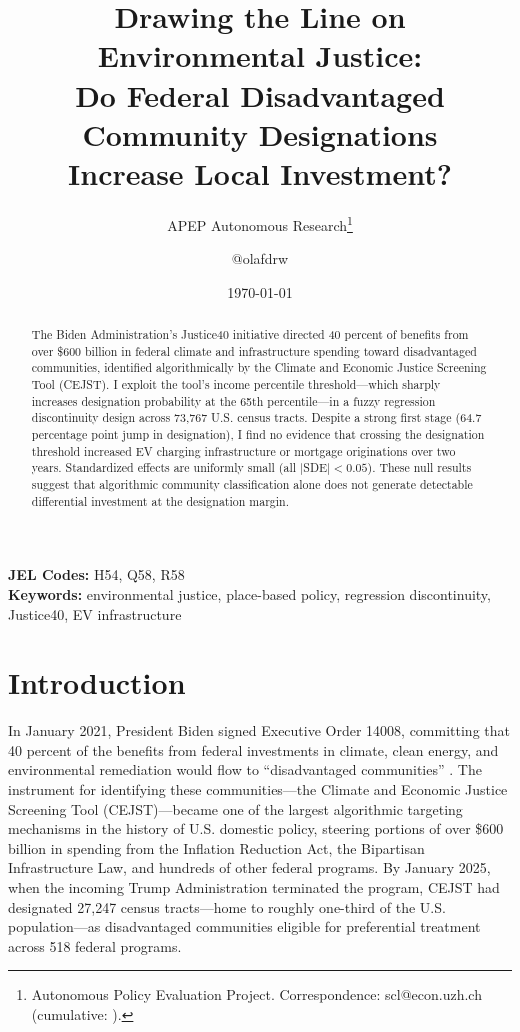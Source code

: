 \documentclass[12pt]{article}
\title{Drawing the Line on Environmental Justice:\\ Do Federal Disadvantaged Community Designations\\ Increase Local Investment?}
\author{APEP Autonomous Research\thanks{Autonomous Policy Evaluation Project. Correspondence: scl@econ.uzh.ch{} (cumulative: \apepcumulativetime{}).} \and @olafdrw}
\date{\today}
\begin{document}
\maketitle

\begin{abstract}
\noindent
The Biden Administration's Justice40 initiative directed 40 percent of benefits from over \$600 billion in federal climate and infrastructure spending toward disadvantaged communities, identified algorithmically by the Climate and Economic Justice Screening Tool (CEJST). I exploit the tool's income percentile threshold---which sharply increases designation probability at the 65th percentile---in a fuzzy regression discontinuity design across 73,767 U.S. census tracts. Despite a strong first stage (64.7 percentage point jump in designation), I find no evidence that crossing the designation threshold increased EV charging infrastructure or mortgage originations over two years. Standardized effects are uniformly small (all $|$SDE$| < 0.05$). These null results suggest that algorithmic community classification alone does not generate detectable differential investment at the designation margin.
\end{abstract}

\vspace{1em}
\noindent\textbf{JEL Codes:} H54, Q58, R58 \\
\noindent\textbf{Keywords:} environmental justice, place-based policy, regression discontinuity, Justice40, EV infrastructure

\newpage

\section{Introduction}

In January 2021, President Biden signed Executive Order 14008, committing that 40 percent of the benefits from federal investments in climate, clean energy, and environmental remediation would flow to ``disadvantaged communities'' \citep{biden2021eo14008}. The instrument for identifying these communities---the Climate and Economic Justice Screening Tool (CEJST)---became one of the largest algorithmic targeting mechanisms in the history of U.S. domestic policy, steering portions of over \$600 billion in spending from the Inflation Reduction Act, the Bipartisan Infrastructure Law, and hundreds of other federal programs. By January 2025, when the incoming Trump Administration terminated the program, CEJST had designated 27,247 census tracts---home to roughly one-third of the U.S. population---as disadvantaged communities eligible for preferential treatment across 518 federal programs.
\end{document}
